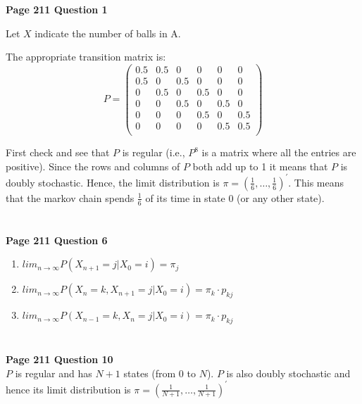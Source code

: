 \documentclass[10pt,a4paper]{article}
\begin{document}
\begin{flushleft}

\begin{eqnarray*}
\\
\end{eqnarray*}


\textbf{Page 211 Question 1}

Let $X$ indicate the number of balls in A.

The appropriate transition matrix is:
\[ P = \left ( \begin{array}{cccccc}
 0.5 & 0.5 & 0 & 0 & 0 & 0 \\
 0.5 & 0 & 0.5 & 0 & 0 & 0  \\
 0 & 0.5 & 0 & 0.5 & 0 & 0  \\
 0 & 0 & 0.5 & 0 & 0.5 & 0  \\
 0 & 0 & 0 & 0.5 & 0 & 0.5  \\
 0 & 0 & 0 & 0 & 0.5 & 0.5  \\
\end{array} \right) \]

First check and see that $P$ is regular (i.e., $P^8$ is a matrix
where all the entries are positive). Since the rows and columns of
$P$ both add up to 1 it means that $P$ is doubly stochastic.
Hence, the limit distribution is
$\pi=(\frac{1}{6},\ldots,\frac{1}{6})^{'}$. This means that the
markov chain spends $\frac{1}{6}$ of its time in state 0 (or any
other state).


\begin{eqnarray*}
\\
\end{eqnarray*}



\textbf{Page 211 Question 6}\\
\begin{enumerate}
    \item $lim_{n\longrightarrow\infty}P(X_{n+1}=j|X_0=i)=\pi_j$
    \item $lim_{n\longrightarrow\infty}P(X_{n}=k,X_{n+1}=j|X_0=i)=\pi_k \cdot p_{kj}$
    \item $lim_{n\longrightarrow\infty}P(X_{n-1}=k,X_{n}=j|X_0=i)=\pi_k \cdot p_{kj}$
\end{enumerate}
\begin{eqnarray*}
\\
\end{eqnarray*}

\textbf{Page 211 Question 10}\\
$P$ is regular and has $N+1$ states (from 0 to $N$). $P$ is also
doubly stochastic and hence its limit distribution is
$\pi=(\frac{1}{N+1},\ldots,\frac{1}{N+1})^{'}$




\end{flushleft}
\end{document}
